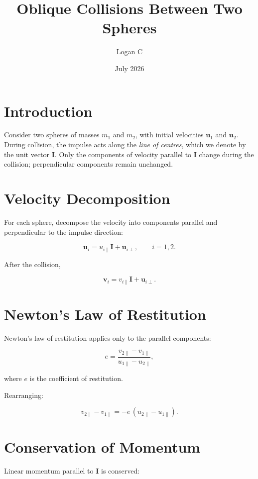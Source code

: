 \documentclass[12pt]{article}
\title{Oblique Collisions Between Two Spheres}
\author{Logan C}
\date{July 2026}
\begin{document}
\maketitle

\section{Introduction}

Consider two spheres of masses \(m_1\) and \(m_2\), with initial velocities
\(\mathbf{u}_1\) and \(\mathbf{u}_2\). During collision, the impulse acts
along the \emph{line of centres}, which we denote by the unit vector
\(\mathbf{I}\). Only the components of velocity parallel to \(\mathbf{I}\)
change during the collision; perpendicular components remain unchanged.

\section{Velocity Decomposition}

For each sphere, decompose the velocity into components parallel and
perpendicular to the impulse direction:


\[
\mathbf{u}_i = u_{i\parallel}\mathbf{I} + \mathbf{u}_{i\perp},
\qquad i = 1,2.
\]


After the collision,


\[
\mathbf{v}_i = v_{i\parallel}\mathbf{I} + \mathbf{u}_{i\perp}.
\]



\section{Newton's Law of Restitution}

Newton's law of restitution applies only to the parallel components:


\[
e = \frac{v_{2\parallel} - v_{1\parallel}}{u_{1\parallel} - u_{2\parallel}},
\]


where \(e\) is the coefficient of restitution.

Rearranging:


\[
v_{2\parallel} - v_{1\parallel}
= -e\,(u_{2\parallel} - u_{1\parallel}).
\]



\section{Conservation of Momentum}

Linear momentum parallel to \(\mathbf{I}\) is conserved:
\end{document}
